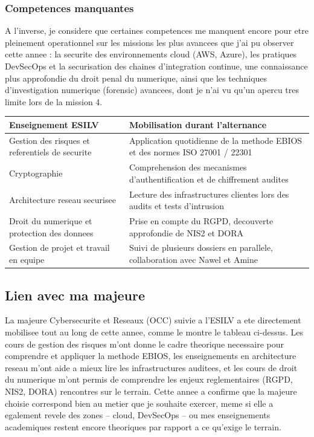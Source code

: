 \documentclass[11pt,a4paper]{article}
\begin{document}
\subsubsection*{Competences manquantes}

A l'inverse, je considere que certaines competences me manquent encore pour etre pleinement operationnel sur les missions les plus avancees que j'ai pu observer cette annee : la securite des environnements cloud (AWS, Azure), les pratiques DevSecOps et la securisation des chaines d'integration continue, une connaissance plus approfondie du droit penal du numerique, ainsi que les techniques d'investigation numerique (forensic) avancees, dont je n'ai vu qu'un apercu tres limite lors de la mission 4.

\begin{center}
\small
\begin{tabular}{@{}p{6.0cm}p{8.0cm}@{}}
\toprule
\textbf{Enseignement ESILV} & \textbf{Mobilisation durant l'alternance} \\
\midrule
Gestion des risques et referentiels de securite & Application quotidienne de la methode EBIOS et des normes ISO 27001 / 22301 \\
Cryptographie & Comprehension des mecanismes d'authentification et de chiffrement audites \\
Architecture reseau securisee & Lecture des infrastructures clientes lors des audits et tests d'intrusion \\
Droit du numerique et protection des donnees & Prise en compte du RGPD, decouverte approfondie de NIS2 et DORA \\
Gestion de projet et travail en equipe & Suivi de plusieurs dossiers en parallele, collaboration avec Nawel et Amine \\
\bottomrule
\end{tabular}
\end{center}

\subsection{Lien avec ma majeure}

La majeure Cybersecurite et Reseaux (OCC) suivie a l'ESILV a ete directement mobilisee tout au long de cette annee, comme le montre le tableau ci-dessus. Les cours de gestion des risques m'ont donne le cadre theorique necessaire pour comprendre et appliquer la methode EBIOS, les enseignements en architecture reseau m'ont aide a mieux lire les infrastructures auditees, et les cours de droit du numerique m'ont permis de comprendre les enjeux reglementaires (RGPD, NIS2, DORA) rencontres sur le terrain. Cette annee a confirme que la majeure choisie correspond bien au metier que je souhaite exercer, meme si elle a egalement revele des zones -- cloud, DevSecOps -- ou mes enseignements academiques restent encore theoriques par rapport a ce qu'exige le terrain.
\end{document}

